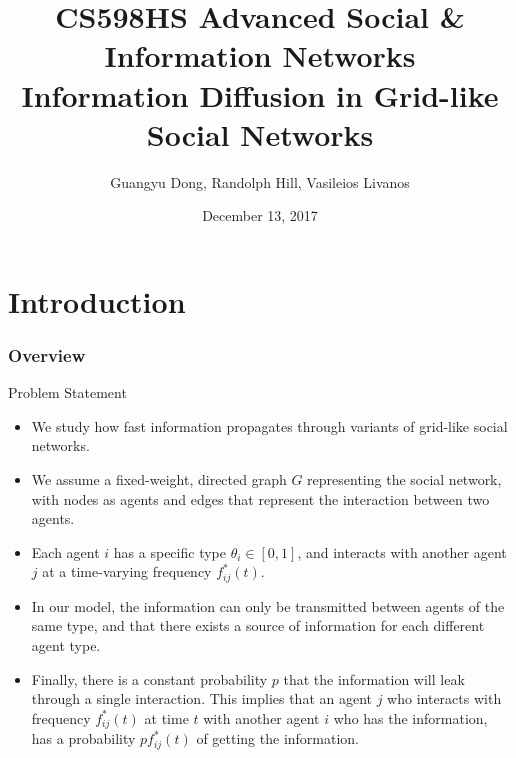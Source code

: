\documentclass{beamer}
\title[Information Diffusion in Grids]{CS598HS Advanced Social \& Information Networks \\ Information Diffusion in Grid-like Social Networks} %
\author[Dong, Hill, Livanos]{Guangyu Dong, Randolph Hill, Vasileios Livanos} %
\institute[UIUC] %
{
Department of Computer Science \\
University of Illinois at Urbana-Champaign \\ %
\medskip
\textit{gdong2@illinois.edu}, \textit{rwhill2@illinois.edu}, \textit{livanos3@illinois.edu} %
}
\date{December 13, 2017} %
\begin{document}
\begin{frame}
\titlepage %
\end{frame}


\section{Introduction}

\begin{frame}
\frametitle{Overview} %
\tableofcontents[currentsection] %
\end{frame}

\begin{frame}{Problem Statement}

\pause
\begin{itemize}
\item We study how fast information propagates through variants of grid-like social networks.
\pause
\item We assume a fixed-weight, directed graph $G$ representing the social network, with nodes as agents and
edges that represent the interaction between two agents.
\pause
\item Each agent $i$ has a specific type $\theta_i \in [0,1]$, and interacts with another agent $j$ at a
time-varying frequency $f^*_{ij}(t)$.
\pause
\item In our model, the information can only be transmitted between agents of the same type, and that there
exists a source of information for each different agent type.
\pause
\item Finally, there is a constant probability $p$ that the information will leak through a single interaction.
This implies that an agent $j$ who interacts with frequency $f^*_{ij}(t)$ at time $t$ with another agent $i$ who has
the information, has a probability $p f^*_{ij}(t)$ of getting the information.
\end{itemize}

\end{frame}
\end{document}
